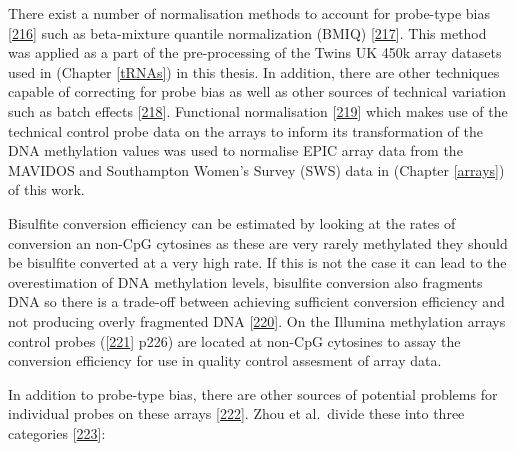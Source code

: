 \documentclass[
]{book}
\begin{document}
There exist a number of normalisation methods to account for probe-type bias {[}\protect\hyperlink{ref-Fortin2016}{216}{]} such as beta-mixture quantile normalization (BMIQ) {[}\protect\hyperlink{ref-Teschendorff2013}{217}{]}.
This method was applied as a part of the pre-processing of the Twins UK 450k array datasets used in (Chapter \ref{tRNAs}) in this thesis.
In addition, there are other techniques capable of correcting for probe bias as well as other sources of technical variation such as batch effects {[}\protect\hyperlink{ref-Leek2010}{218}{]}.
Functional normalisation {[}\protect\hyperlink{ref-Fortin2014}{219}{]} which makes use of the technical control probe data on the arrays to inform its transformation of the DNA methylation values was used to normalise EPIC array data from the MAVIDOS and Southampton Women's Survey (SWS) data in (Chapter \ref{arrays}) of this work.

Bisulfite conversion efficiency can be estimated by looking at the rates of conversion an non-CpG cytosines as these are very rarely methylated they should be bisulfite converted at a very high rate.
If this is not the case it can lead to the overestimation of DNA methylation levels, bisulfite conversion also fragments DNA so there is a trade-off between achieving sufficient conversion efficiency and not producing overly fragmented DNA {[}\protect\hyperlink{ref-Ehrich2007}{220}{]}.
On the Illumina methylation arrays control probes ({[}\protect\hyperlink{ref-Illumina2015}{221}{]} p226) are located at non-CpG cytosines to assay the conversion efficiency for use in quality control assesment of array data.

In addition to probe-type bias, there are other sources of potential problems for individual probes on these arrays {[}\protect\hyperlink{ref-Pidsley2016}{222}{]}.
Zhou et al.~divide these into three categories {[}\protect\hyperlink{ref-Zhou2017}{223}{]}:
\end{document}
